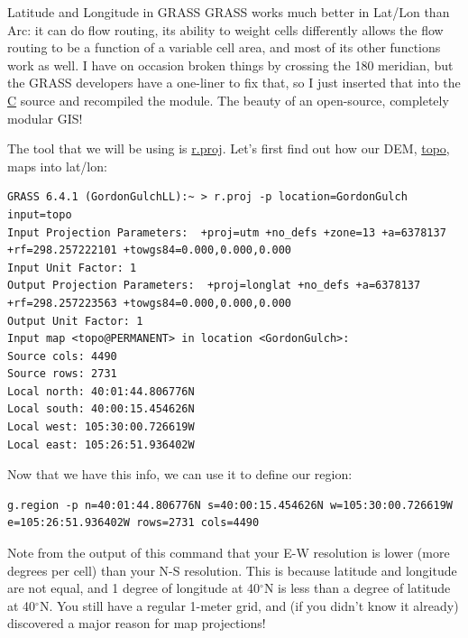 \documentclass{book}
\begin{document}
\begin{boxx}[!ht]
\begin{bclogo}[arrondi = 0.1, logo = \bcrosevents]{Latitude and Longitude in GRASS}
GRASS works much better in Lat/Lon than Arc: it can do flow routing, its ability to weight cells differently allows the flow routing to be a function of a variable cell area, and most of its other functions work as well. I have on occasion broken things by crossing the 180 meridian, but the GRASS developers have a one-liner to fix that, so I just inserted that into the \url{C} source and recompiled the module. The beauty of an open-source, completely modular GIS!
\end{bclogo}
\caption{Latitude and Longitude in GRASS}
\end{boxx}

The tool that we will be using is \url{r.proj}. Let's first find out how our DEM, \url{topo}, maps into lat/lon:
\begin{lstlisting}
GRASS 6.4.1 (GordonGulchLL):~ > r.proj -p location=GordonGulch input=topo
Input Projection Parameters:  +proj=utm +no_defs +zone=13 +a=6378137 +rf=298.257222101 +towgs84=0.000,0.000,0.000
Input Unit Factor: 1
Output Projection Parameters:  +proj=longlat +no_defs +a=6378137 +rf=298.257223563 +towgs84=0.000,0.000,0.000
Output Unit Factor: 1
Input map <topo@PERMANENT> in location <GordonGulch>:
Source cols: 4490
Source rows: 2731
Local north: 40:01:44.806776N
Local south: 40:00:15.454626N
Local west: 105:30:00.726619W
Local east: 105:26:51.936402W
\end{lstlisting}
Now that we have this info, we can use it to define our region:
\begin{lstlisting}
g.region -p n=40:01:44.806776N s=40:00:15.454626N w=105:30:00.726619W e=105:26:51.936402W rows=2731 cols=4490
\end{lstlisting}
Note from the output of this command that your E-W resolution is lower (more degrees per cell) than your N-S resolution. This is because latitude and longitude are not equal, and 1 degree of longitude at 40$^\circ$N is less than a degree of latitude at 40$^\circ$N. You still have a regular 1-meter grid, and (if you didn't know it already) discovered a major reason for map projections!
\end{document}
